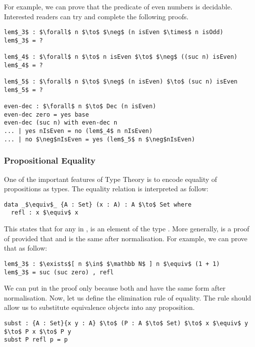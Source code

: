 \par For example, we can prove that the predicate of even numbers is
decidable. Interested readers can try and complete the following proofs. 
\begin{lstlisting}[mathescape=true,xleftmargin=.3\textwidth]
lem$_3$ : $\forall$ n $\to$ $\neg$ (n isEven $\times$ n isOdd)
lem$_3$ = ?

lem$_4$ : $\forall$ n $\to$ n isEven $\to$ $\neg$ ((suc n) isEven)
lem$_4$ = ?

lem$_5$ : $\forall$ n $\to$ $\neg$ (n isEven) $\to$ (suc n) isEven
lem$_5$ = ?

even-dec : $\forall$ n $\to$ Dec (n isEven)
even-dec zero = yes base
even-dec (suc n) with even-dec n
... | yes nIsEven = no (lem$_4$ n nIsEven)
... | no $\neg$nIsEven = yes (lem$_5$ n $\neg$nIsEven)
\end{lstlisting} 


\subsubsection{Propositional Equality} 
\par One of the important features of Type Theory is
to encode equality of propositions as types. The
equality relation is interpreted as follow:
\begin{lstlisting}[mathescape=true,xleftmargin=.3\textwidth]
data _$\equiv$_ {A : Set} (x : A) : A $\to$ Set where
  refl : x $\equiv$ x
\end{lstlisting}

\par This states that for any  in ,  is an
element of the type . More generally,  is a
proof of  provided that  and  is the same
after normalisation. For example, we can prove that  as follow:
\begin{lstlisting}[mathescape=true,xleftmargin=.3\textwidth]
lem$_3$ : $\exists$[ n $\in$ $\mathbb N$ ] n $\equiv$ (1 + 1)
lem$_3$ = suc (suc zero) , refl
\end{lstlisting}

\par We can put  in the proof only because both
 and  have the same form after
normalisation. Now, let us define the elimination rule of
equality. The rule should allow us to substitute equivalence objects
into any proposition. 
\begin{lstlisting}[mathescape=true,xleftmargin=.3\textwidth]
subst : {A : Set}{x y : A} $\to$ (P : A $\to$ Set) $\to$ x $\equiv$ y $\to$ P x $\to$ P y
subst P refl p = p 
\end{lstlisting}

